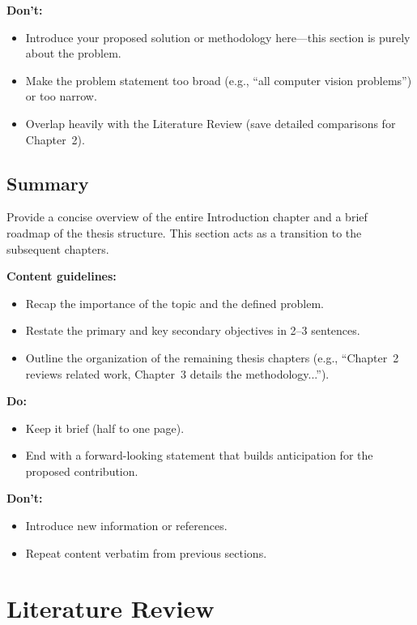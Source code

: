 \documentclass[12pt,a4paper]{report}
\theoremstyle{definition}
\theoremstyle{remark}
\begin{document}
\noindent \textbf{Don’t:}
\begin{itemize}
    \item Introduce your proposed solution or methodology here—this section is purely about the problem.
    \item Make the problem statement too broad (e.g., ``all computer vision problems'') or too narrow.
    \item Overlap heavily with the Literature Review (save detailed comparisons for Chapter~2).
\end{itemize}

\section{Summary}
\label{sec:intro-summary}

Provide a concise overview of the entire Introduction chapter and a brief roadmap of the thesis structure. This section acts as a transition to the subsequent chapters.

\noindent \textbf{Content guidelines:}
\begin{itemize}
    \item Recap the importance of the topic and the defined problem.
    \item Restate the primary and key secondary objectives in 2--3 sentences.
    \item Outline the organization of the remaining thesis chapters (e.g., ``Chapter~2 reviews related work, Chapter~3 details the methodology...'').
\end{itemize}

\noindent \textbf{Do:}
\begin{itemize}
    \item Keep it brief (half to one page).
    \item End with a forward-looking statement that builds anticipation for the proposed contribution.
\end{itemize}

\noindent \textbf{Don’t:}
\begin{itemize}
    \item Introduce new information or references.
    \item Repeat content verbatim from previous sections.
\end{itemize}

\chapter{Literature Review}
\end{document}
